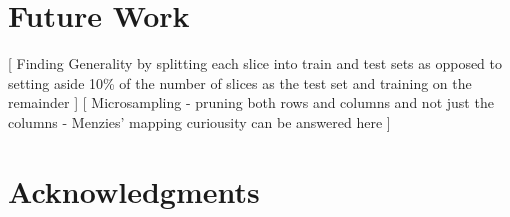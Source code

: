 \documentclass{sig-alternate}
\begin{document}
\section{Future Work}
[ Finding Generality by splitting each slice into train and test sets as opposed to setting aside 10\% of the number of slices as the test set and training on the remainder ]
[ Microsampling - pruning both rows and columns and not just the columns - Menzies' mapping curiousity can be answered here ]

\section{Acknowledgments}

%

%
%
\end{document}
